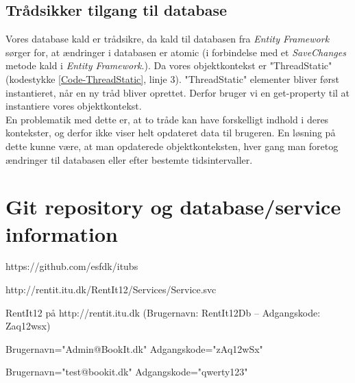 \subsection*{Trådsikker tilgang til database}
\label{Technical_CodeExamples_threadstatic}
Vores database kald er trådsikre, da kald til databasen fra \textit{Entity Framework} sørger for, at ændringer i databasen er atomic (i forbindelse med et \textit{SaveChanges} metode kald i \textit{Entity Framework}.). 
Da vores objektkontekst er "ThreadStatic" (kodestykke \ref{Code-ThreadStatic}, linje 3). "ThreadStatic" elementer bliver først instantieret, når en ny tråd bliver oprettet. Derfor bruger vi en get-property til at instantiere vores objektkontekst. 
\\En problematik med dette er, at to tråde kan have forskelligt indhold i deres kontekster, og derfor ikke viser helt opdateret data til brugeren. En løsning på dette kunne være, at man opdaterede objektkonteksten, hver gang man foretog ændringer til databasen eller efter bestemte tidsintervaller.


\section{Git repository og database/service information}
\begin{my_description}
\item[GitHub repository] https://github.com/esfdk/itubs
\item[Service URL] http://rentit.itu.dk/RentIt12/Services/Service.svc
\item[Database] RentIt12 på http://rentit.itu.dk (Brugernavn: RentIt12Db -- Adgangskode: Zaq12wsx)
\item[Test Administrator] Brugernavn="Admin@BookIt.dk" Adgangskode="zAq12wSx"
\item[Test Bruger] Brugernavn="test@bookit.dk" Adgangskode="qwerty123"
\end{my_description}